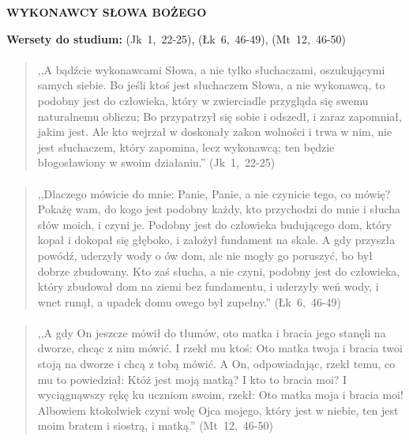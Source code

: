 \documentclass[10pt,a4paper,oneside]{article}
\begin{document}
\centerline{\textbf{\MakeUppercase{Wykonawcy Słowa Bożego}}}
\begin{center}
\textbf{Wersety do studium:} 
\mbox{(Jk 1, 22-25)}, \mbox{(Łk 6, 46-49)}, \mbox{(Mt 12, 46-50)}
\end{center}
\paragraph{}
\begin{quote}
,,A bądźcie wykonawcami Słowa, a nie tylko słuchaczami, oszukującymi samych siebie. Bo jeśli ktoś jest słuchaczem Słowa, a nie wykonawcą, to podobny jest do człowieka, który w zwierciadle przygląda się swemu naturalnemu obliczu; Bo przypatrzył się sobie i odszedł, i zaraz zapomniał, jakim jest. Ale kto wejrzał w doskonały zakon wolności i trwa w nim, nie jest słuchaczem, który zapomina, lecz wykonawcą; ten będzie błogosławiony w swoim działaniu.'' \mbox{(Jk 1, 22-25)}
\end{quote}
\paragraph{}
\begin{quote}
,,Dlaczego mówicie do mnie: Panie, Panie, a nie czynicie tego, co mówię? Pokażę wam, do kogo jest podobny każdy, kto przychodzi do mnie i słucha słów moich, i czyni je. Podobny jest do człowieka budującego dom, który kopał i dokopał się głęboko, i założył fundament na skale. A gdy przyszła powódź, uderzyły wody o ów dom, ale nie mogły go poruszyć, bo był dobrze zbudowany. Kto zaś słucha, a nie czyni, podobny jest do człowieka, który zbudował dom na ziemi bez fundamentu, i uderzyły weń wody, i wnet runął, a upadek domu owego był zupełny.'' \mbox{(Łk 6, 46-49)}
\end{quote}
\paragraph{}
\begin{quote}
,,A gdy On jeszcze mówił do tłumów, oto matka i bracia jego stanęli na dworze, chcąc z nim mówić. I rzekł mu ktoś: Oto matka twoja i bracia twoi stoją na dworze i chcą z tobą mówić. A On, odpowiadając, rzekł temu, co mu to powiedział: Któż jest moją matką? I kto to bracia moi? I wyciągnąwszy rękę ku uczniom swoim, rzekł: Oto matka moja i bracia moi! Albowiem ktokolwiek czyni wolę Ojca mojego, który jest w niebie, ten jest moim bratem i siostrą, i matką.'' \mbox{(Mt 12, 46-50)}
\end{quote}
\end{document}

